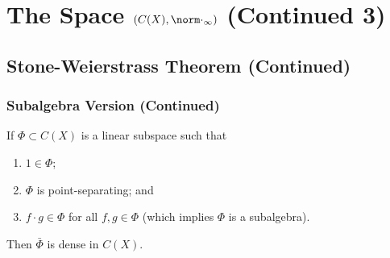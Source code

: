 \documentclass[notoc,notitlepage]{tufte-book}
\begin{document}
\section{The Space $(C(X), \norm\cdot_\infty)$ (Continued 3)}%
\label{sec:the_space_c_x_normcdot_infty_continued_3}

\subsection{Stone-Weierstrass Theorem (Continued)}%
\label{sub:stone_weierstrass_theorem_continued}

\subsubsection{Subalgebra Version (Continued)}%
\label{ssub:subalgebra_version_continued}

\begin{thm}\label{thm:stone_weierstrass_theorem_subalgebra_version}
  If $\Phi \subset C(X)$ is a linear subspace such that
  \begin{enumerate}
    \item $1 \in \Phi$;
    \item $\Phi$ is point-separating; and
    \item $f \cdot g \in \Phi$ for all $f, g \in \Phi$ (which implies $\Phi$ is a subalgebra).
  \end{enumerate}
  Then $\bar{\Phi}$ is dense in $C(X)$.
\end{thm}
\end{document}
